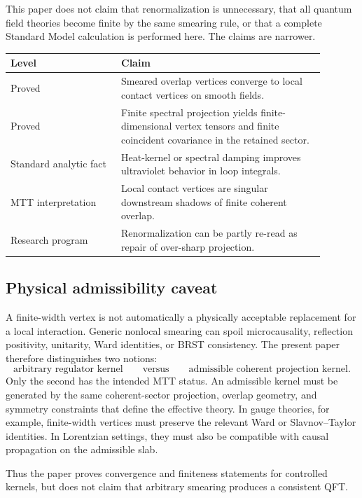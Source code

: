 \documentclass[11pt]{article}
\begin{document}
This paper does not claim that renormalization is unnecessary, that all quantum field theories
become finite by the same smearing rule, or that a complete Standard Model calculation is
performed here.  The claims are narrower.

\begin{center}
\begin{tabular}{p{0.31\linewidth}p{0.58\linewidth}}
\hline
\textbf{Level} & \textbf{Claim}\\
\hline
Proved & Smeared overlap vertices converge to local contact vertices on smooth fields.\\
Proved & Finite spectral projection yields finite-dimensional vertex tensors and finite
coincident covariance in the retained sector.\\
Standard analytic fact & Heat-kernel or spectral damping improves ultraviolet behavior in loop
integrals.\\
MTT interpretation & Local contact vertices are singular downstream shadows of finite coherent
overlap.\\
Research program & Renormalization can be partly re-read as repair of over-sharp projection.\\
\hline
\end{tabular}
\end{center}

\subsection{Physical admissibility caveat}

A finite-width vertex is not automatically a physically acceptable replacement for a local
interaction.  Generic nonlocal smearing can spoil microcausality, reflection positivity,
unitarity, Ward identities, or BRST consistency.  The present paper therefore distinguishes
two notions:
\[
\text{arbitrary regulator kernel}
\qquad\text{versus}\qquad
\text{admissible coherent projection kernel}.
\]
Only the second has the intended MTT status.  An admissible kernel must be generated by the
same coherent-sector projection, overlap geometry, and symmetry constraints that define the
effective theory.  In gauge theories, for example, finite-width vertices must preserve the
relevant Ward or Slavnov--Taylor identities.  In Lorentzian settings, they must also be
compatible with causal propagation on the admissible slab.

Thus the paper proves convergence and finiteness statements for controlled kernels, but does
not claim that arbitrary smearing produces a consistent QFT.
\end{document}

